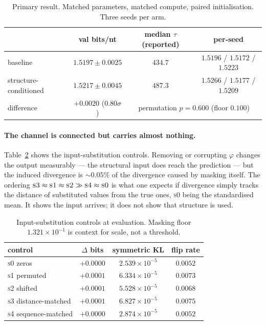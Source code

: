 \documentclass[10pt]{article}
\begin{document}
\begin{table}[t]
\centering\small
\caption{Primary result. Matched parameters, matched compute, paired
initialisation. Three seeds per arm.}
\label{tab:main}
\begin{tabular}{lccc}
\toprule
 & val bits/nt & median $\tau$ (reported) & per-seed \\
\midrule
baseline & $\mathbf{1.5197 \pm 0.0025}$ & $434.7$ & $1.5196$ / $1.5172$ / $1.5223$ \\
structure-conditioned & $1.5217 \pm 0.0045$ & $487.3$ & $1.5266$ / $1.5177$ / $1.5209$ \\
\midrule
difference & $+0.0020$ ($0.80\sigma$) & \multicolumn{2}{c}{permutation $p = 0.600$ (floor $0.100$)} \\
\bottomrule
\end{tabular}
\end{table}

\paragraph{The channel is connected but carries almost nothing.}
Table~\ref{tab:controls} shows the input-substitution controls. Removing or
corrupting $\varphi$ changes the output measurably --- the structural input does
reach the prediction --- but the induced divergence is $\sim\!0.05\%$ of the
divergence caused by masking itself. The ordering
$\textsc{s3}\approx\textsc{s1}\approx\textsc{s2} \gg \textsc{s4}\approx\textsc{s0}$
is what one expects if divergence simply tracks the distance of substituted
values from the true ones, \textsc{s0} being the standardised mean. It shows the
input arrives; it does not show that structure is used.

\begin{table}[t]
\centering\small
\caption{Input-substitution controls at evaluation. Masking floor
$1.321\times10^{-1}$ is context for scale, not a threshold.}
\label{tab:controls}
\begin{tabular}{lccc}
\toprule
control & $\Delta$ bits & symmetric KL & flip rate \\
\midrule
\textsc{s0} zeros            & $+0.0000$ & $2.539\times10^{-5}$ & $0.0052$ \\
\textsc{s1} permuted         & $+0.0001$ & $6.334\times10^{-5}$ & $0.0073$ \\
\textsc{s2} shifted          & $+0.0001$ & $5.528\times10^{-5}$ & $0.0068$ \\
\textsc{s3} distance-matched & $+0.0001$ & $6.827\times10^{-5}$ & $0.0075$ \\
\textsc{s4} sequence-matched & $+0.0000$ & $2.874\times10^{-5}$ & $0.0052$ \\
\bottomrule
\end{tabular}
\end{table}
\end{document}
